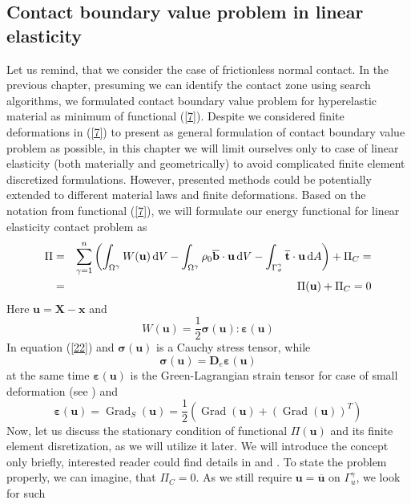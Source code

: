 \documentclass{article}
\newcommand{\beq}{\begin{equation}}
\newcommand{\eeq}{\end{equation}}
\newcommand{\bea}{\begin{eqnarray}}
\newcommand{\eea}{\end{eqnarray}}
\newcommand{\dd}{\,{\rm d}}
\begin{document}
\subsection{Contact boundary value problem in linear elasticity}  
Let us remind, that we consider the case of frictionless normal contact. In the previous chapter, presuming we can identify the contact zone using search algorithms, we formulated contact boundary value problem for hyperelastic material as minimum of functional (\ref{7}). Despite we considered finite deformations in (\ref{7}) to present as general formulation of contact boundary value problem as possible, in this chapter we will limit ourselves only to case of linear elasticity (both materially and geometrically) to avoid complicated finite element discretized formulations. However, presented methods could be potentially extended to different material laws and finite deformations. Based on the notation from functional (\ref{7}), we will formulate our energy functional for linear elasticity contact problem as  
\bea\label{21}
\Pi&=&\sum^{n}_{\gamma = 1}\left(\int_{\Omega^{\gamma}} W(\mathbf{u})\dd V-\int_{\Omega^{\gamma}} \rho_{0}\overline{\mathbf{b}} \cdot \mathbf{u} \dd V-\int_{\Gamma_{\sigma}^{\gamma}} \overline{\mathbf{t}} \cdot \mathbf{u} \dd A\right) + \Pi_{C}=
\nonumber
\\
&=&\Pi(\mathbf{u})+ \Pi_{C} = 0
\eea  
Here $ \mathbf{u} = \mathbf{X} - \mathbf{x} $ and
\begin{equation}\label{22}
W(\mathbf{u})=\frac{1}{2} \bm{\sigma(\mathbf{u})} : \bm{\varepsilon(\mathbf{u})}
\end{equation} 
In equation (\ref{22}) and $ \bm{\sigma}(\mathbf{u}) $ is a Cauchy stress tensor, while
\beq\label{23}
\bm{\sigma}(\mathbf{u}) = \mathbf{D}_{e} \bm{\varepsilon}(\mathbf{u})
\eeq 
at the same time $ \bm{\varepsilon}(\mathbf{u}) $ is the Green-Lagrangian strain tensor for case of small deformation (see \cite[Chapter 2, p.24]{Wriggers}) and
\beq\label{24}
\bm{\varepsilon}(\mathbf{u}) = \operatorname{Grad}_{S}(\mathbf{u})=\frac{1}{2}\left(\operatorname{Grad}(\mathbf{u})+(\operatorname{Grad}(\mathbf{u}))^{T} \right) 
\eeq
Now, let us discuss the stationary condition of functional $ \Pi(\mathbf{u}) $ and its finite element disretization, as we will utilize it later. We will introduce the concept only briefly, interested reader could find details in \cite{Zienkiewicz} and \cite{Zienkiewicz2}. To state the problem properly, we can imagine, that $ \Pi_{C} = 0 $. As we still require $ \mathbf{u}=\overline{\mathbf{u}} \text{ on } \Gamma_{u}^{\gamma} $, we look for such 
\end{document}

